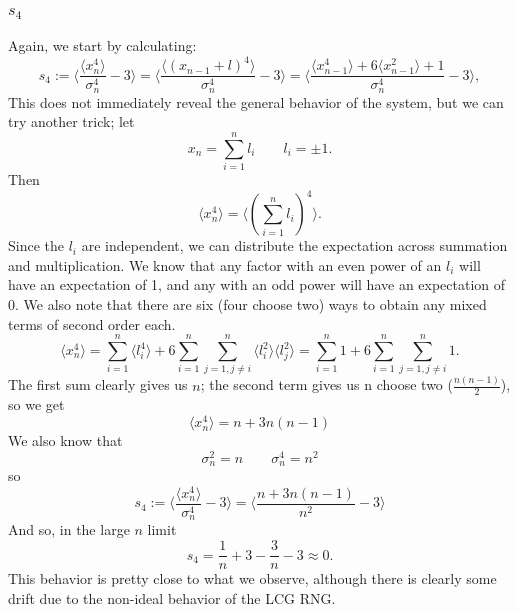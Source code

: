 \documentclass{article}
\begin{document}
\subsubsection{$s_4$}
Again, we start by calculating:
$$s_4 := \langle \frac{\langle x_n^4 \rangle}{\sigma_n^4}-3\rangle = \langle \frac{\langle (x_{n-1} + l)^4 \rangle}{\sigma_n^4}-3\rangle = \langle \frac{\langle x_{n-1}^4 \rangle + 6\langle x_{n-1}^2 \rangle + 1}{\sigma_n^4}-3\rangle,$$
This does not immediately reveal the general behavior of the system, but we can try another trick; let
$$x_n = \sum\limits_{i=1}^{n}l_i \qquad l_i = \pm1.$$
Then
$$\langle x_n^4 \rangle =  \langle (\sum\limits_{i=1}^{n}l_i)^4 \rangle.$$
Since the $l_i$ are independent, we can distribute the expectation across summation and multiplication. We know that any factor with an even power of an $l_i$ will have an expectation of 1, and any with an odd power will have an expectation of 0. We also note that there are six (four choose two) ways to obtain any mixed terms of second order each.
$$\langle x_n^4 \rangle =  \sum\limits_{i=1}^{n}\langle l_i^4\rangle + 6\sum\limits_{i=1}^{n}\sum\limits_{j=1, j \neq i}^{n}\langle l_i^2\rangle \langle l_j^2\rangle =  \sum\limits_{i=1}^{n}1 + 6\sum\limits_{i=1}^{n}\sum\limits_{j=1, j \neq i}^{n}1.$$
The first sum clearly gives us $n$; the second term gives us n choose two ($\frac{n(n-1)}{2}$), so we get
$$\langle x_n^4 \rangle = n + 3n(n-1)$$
We also know that
$$\sigma_n^2 = n \qquad \sigma_n^4 = n^2$$
so
$$s_4 := \langle \frac{\langle x_n^4 \rangle}{\sigma_n^4}-3\rangle = \langle \frac{n + 3n(n-1)}{n^2} -3 \rangle$$
And so, in the large $n$ limit
$$s_4 = \frac{1}{n} + 3 - \frac{3}{n} - 3 \approx 0.$$
This behavior is pretty close to what we observe, although there is clearly some drift due to the non-ideal behavior of the LCG RNG.
\end{document}
